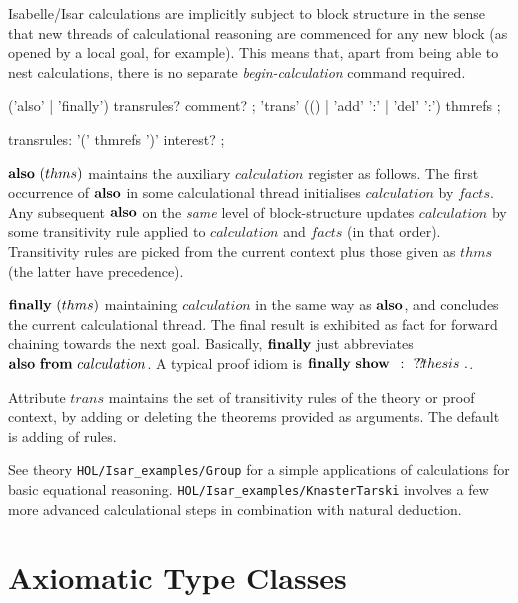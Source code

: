 Isabelle/Isar calculations are implicitly subject to block structure in the
sense that new threads of calculational reasoning are commenced for any new
block (as opened by a local goal, for example).  This means that, apart from
being able to nest calculations, there is no separate \emph{begin-calculation}
command required.

\begin{rail}
  ('also' | 'finally') transrules? comment?
  ;
  'trans' (() | 'add' ':' | 'del' ':') thmrefs
  ;

  transrules: '(' thmrefs ')' interest?
  ;
\end{rail}

\begin{descr}
\item [${\mathord{\mathbf{also}}}~(thms)$] maintains the auxiliary $calculation$ register as
  follows.  The first occurrence of ${\mathord{\mathbf{also}}}$ in some calculational thread
  initialises $calculation$ by $facts$. Any subsequent ${\mathord{\mathbf{also}}}$ on the
  \emph{same} level of block-structure updates $calculation$ by some
  transitivity rule applied to $calculation$ and $facts$ (in that order).
  Transitivity rules are picked from the current context plus those given as
  $thms$ (the latter have precedence).
  
\item [${\mathord{\mathbf{finally}}}~(thms)$] maintaining $calculation$ in the same way as
  ${\mathord{\mathbf{also}}}$, and concludes the current calculational thread.  The final result
  is exhibited as fact for forward chaining towards the next goal. Basically,
  ${\mathord{\mathbf{finally}}}$ just abbreviates ${\mathord{\mathbf{also}}}~{\mathord{\mathbf{from}}}~calculation$.  A typical proof
  idiom is $\FINALLY~\SHOW~\VVar{thesis}~\DOT$.
  
\item [Attribute $trans$] maintains the set of transitivity rules of the
  theory or proof context, by adding or deleting the theorems provided as
  arguments.  The default is adding of rules.
\end{descr}

See theory \texttt{HOL/Isar_examples/Group} for a simple applications of
calculations for basic equational reasoning.
\texttt{HOL/Isar_examples/KnasterTarski} involves a few more advanced
calculational steps in combination with natural deduction.


\section{Axiomatic Type Classes}\label{sec:axclass}


